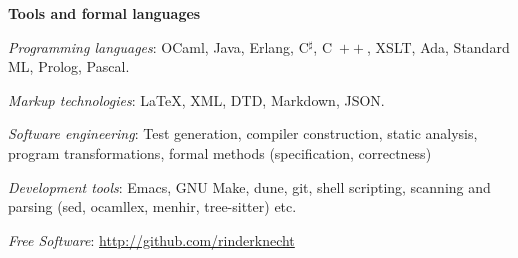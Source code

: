 \documentclass[a4paper,11pt]{article}
\newcommand{\cpp}{\mbox{C \hspace*{-2.5mm} \raise 0.7mm \hbox{${\scriptscriptstyle ++}$}}}
\begin{document}
\bigskip
\noindent\textbf{\large Tools and formal languages}
\medskip
\begin{itemize*}

  \item \textit{Programming languages}: OCaml, Java, Erlang,
    C$^\sharp$, \cpp, XSLT, Ada, Standard ML, Prolog, Pascal.

  \item \textit{Markup technologies}: \LaTeX, XML, DTD, Markdown,
    JSON.


  \item \textit{Software engineering}: Test generation, compiler
    construction, static analysis, program transformations, formal
    methods (specification, correctness) %



  \item \textit{Development tools}: Emacs, GNU Make, dune, git, shell
    scripting, scanning and parsing (sed, ocamllex, menhir,
    tree-sitter) etc.

  \item \textit{Free Software}: \url{http://github.com/rinderknecht}


\end{itemize*}
\end{document}
